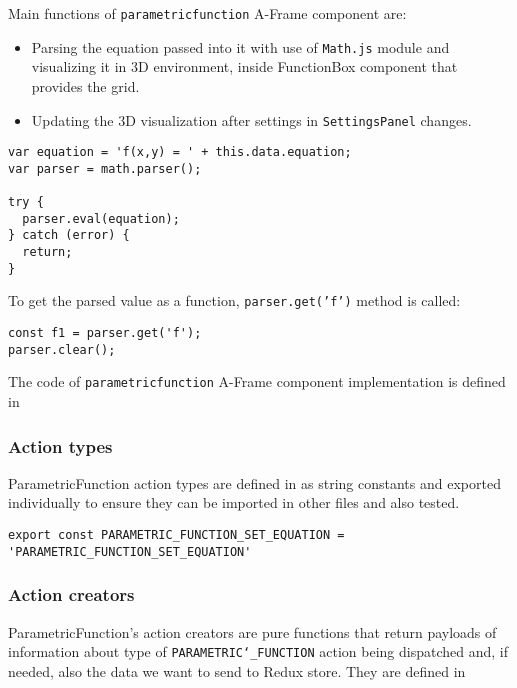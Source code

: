 Main functions of \texttt{parametricfunction} A-Frame component are:
\begin{itemize}
\item{Parsing the equation passed into it with use of \texttt{Math.js} module and visualizing it in 3D environment, inside FunctionBox component that provides the grid.}
\item{Updating the 3D visualization after settings in \texttt{SettingsPanel} changes.}
\end{itemize}

\begin{lstlisting}[caption={Parsing of the equation.},captionpos=b]
var equation = 'f(x,y) = ' + this.data.equation;
var parser = math.parser();

try {
  parser.eval(equation);
} catch (error) {
  return;
}
\end{lstlisting}

To get the parsed value as a function, \texttt{parser.get('f')} method is called:

\begin{lstlisting}
const f1 = parser.get('f');
parser.clear();
\end{lstlisting}

The code of \texttt{parametricfunction} A-Frame component implementation is defined in 
    
\subsubsection{Action types}
ParametricFunction action types are defined in  as string constants and exported individually to ensure they can be imported in other files and also tested.

\begin{lstlisting}[caption={\texttt{parametricFunction} action types.},captionpos=b]
export const PARAMETRIC_FUNCTION_SET_EQUATION = 'PARAMETRIC_FUNCTION_SET_EQUATION'
\end{lstlisting}

\subsubsection{Action creators}
ParametricFunction's action creators are pure functions that return payloads of information about type of \texttt{PARAMETRIC\char`_FUNCTION} action being dispatched and, if needed, also the data we want to send to Redux store. They are defined in 

